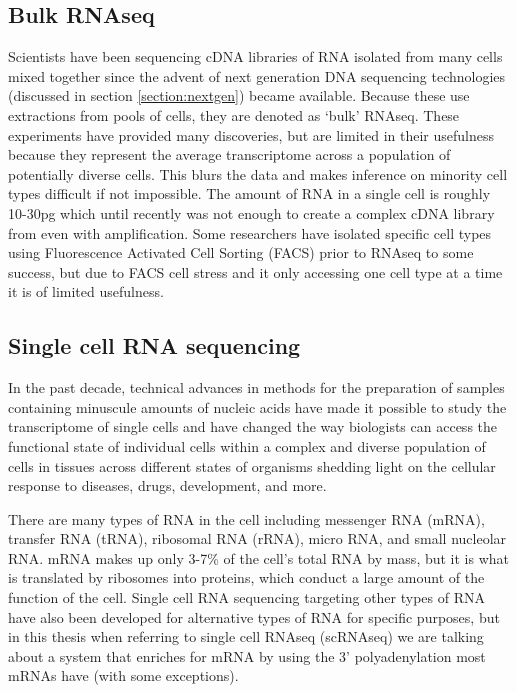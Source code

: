 \subsection{Bulk RNAseq}
\par{
Scientists have been sequencing cDNA libraries of RNA isolated from many cells mixed together since the advent of next generation DNA sequencing technologies (discussed in section \ref{section:nextgen}) became available\cite{RNAseq1}\cite{RNAseq2}. Because these use extractions from pools of cells, they are denoted as `bulk' RNAseq. These experiments have provided many discoveries, but are limited in their usefulness because they represent the average transcriptome across a population of potentially diverse cells. This blurs the data and makes inference on minority cell types difficult if not impossible. The amount of RNA in a single cell is roughly 10-30pg\cite{howmuchrna} which until recently was not enough to create a complex cDNA library from even with amplification. Some researchers have isolated specific cell types using Fluorescence Activated Cell Sorting (FACS)\cite{FACspatent}\cite{FACs} prior to RNAseq to some success\cite{FACszebra}, but due to FACS cell stress and it only accessing one cell type at a time it is of limited usefulness.
}

\subsection{Single cell RNA sequencing}

\par{
In the past decade, technical advances in methods for the preparation of samples containing minuscule amounts of nucleic acids have made it possible to study the transcriptome of single cells\cite{first_singlecell} and have changed the way biologists can access the functional state of individual cells within a complex and diverse population of cells in tissues across different states of organisms shedding light on the cellular response to diseases, drugs, development, and more.
} 
\par{
There are many types of RNA in the cell including messenger RNA (mRNA), transfer RNA (tRNA), ribosomal RNA (rRNA), micro RNA, and small nucleolar RNA. mRNA makes up only 3-7\% of the cell's total RNA by mass\cite{rnacontent}, but it is what is translated by ribosomes into proteins, which conduct a large amount of the function of the cell. Single cell RNA sequencing targeting other types of RNA have also been developed for alternative types of RNA for specific purposes\cite{nonmRNASC}, but in this thesis when referring to single cell RNAseq (scRNAseq) we are talking about a system that enriches for mRNA by using the 3' polyadenylation most mRNAs have (with some exceptions\cite{nonpoly}).
}

